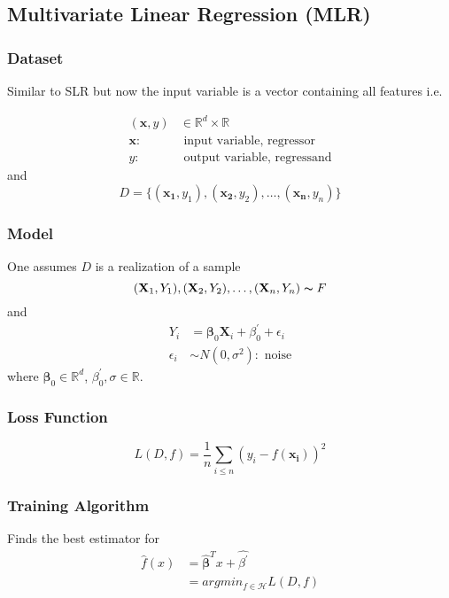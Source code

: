 \subsection{Multivariate Linear Regression (MLR)}
\subsubsection{Dataset}
Similar to SLR but now the input variable is a vector containing all features i.e.

\begin{align*}
    (\mathbf{x},y) & \in\mathbb{R}^d\times\mathbb{R}     \\
    \mathbf{x}:    & \text{ input variable, regressor}   \\
    y:             & \text{ output variable, regressand}
\end{align*}
and
\begin{equation*}
    D=\{(\mathbf{x_1},y_1),(\mathbf{x_2},y_2),\dots,(\mathbf{x_n},y_n)\}
\end{equation*}

\subsubsection{Model}
One assumes $D$ is a realization of a sample
\begin{equation*}
    (\mathbf{X}_1,Y_1),(\mathbf{X}_2,Y_2),\dots,(\mathbf{X}_n,Y_n)\thicksim F
\end{equation*}
and
\begin{align*}
    Y_i        & =\boldsymbol{\beta}_0\mathbf{X}_i+\beta^{\prime}_0+\epsilon_i \\
    \epsilon_i & \sim N(0,\sigma^2): \text{ noise}
\end{align*}
where $\boldsymbol{\beta}_0\in \mathbb{R}^d$, $\beta^{\prime}_0,\sigma \in \mathbb{R}$.

\subsubsection{Loss Function}
\begin{equation*}
    L(D,f)=\frac{1}{n}\sum_{i\leq n}{\left(y_i-f(\mathbf{x_i})\right)}^2
\end{equation*}


\subsubsection{Training Algorithm}
Finds the best estimator for
\begin{align*}
    \hat{f}(x) & =\hat{\boldsymbol{\beta}}^T x+\widehat{\beta^{\prime}} \\
               & =argmin_{f\in\mathcal{H}}L(D,f)
\end{align*}

